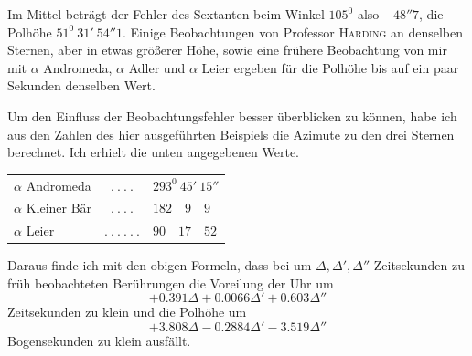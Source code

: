 Im Mittel beträgt der Fehler des Sextanten beim Winkel $105^0$ also $-48''7$, die Polhöhe $51^0\ 31'\ 54''1$. Einige Beobachtungen von Professor \textsc{Harding}
%
an denselben Sternen, aber in etwas größerer Höhe, sowie eine frühere Beobachtung von mir mit $\alpha$ Andromeda, $\alpha$ Adler und $\alpha$ Leier ergeben für die Polhöhe bis auf ein paar Sekunden denselben Wert.

Um den Einfluss der Beobachtungsfehler besser überblicken zu können, habe ich aus den Zahlen des hier ausgeführten Beispiels die Azimute zu den drei Sternen berechnet. Ich erhielt die unten angegebenen Werte.
\begin{center}
\begin{tabular}{lcl}
$\alpha$ Andromeda & $.\ .\ .\ .$ & $293^{0}\ 45'\ 15''$\\
$\alpha$ Kleiner Bär & $.\ .\ .\ .$ & $182\quad9\quad9$\\
$\alpha$ Leier & $.\ .\ .\ .\ .\ .$ & $90\quad17\quad52$
\end{tabular}
\end{center}
Daraus finde ich mit den obigen Formeln, dass bei um $\Delta,\Delta',\Delta''$ Zeitsekunden zu früh beobachteten Berührungen die Voreilung der Uhr um
\[
+0.391\Delta+0.0066\Delta'+0.603\Delta''
\]
Zeitsekunden zu klein und die Polhöhe um
\[
+3.808\Delta-0.2884\Delta'-3.519\Delta''
\]
Bogensekunden zu klein ausfällt.

